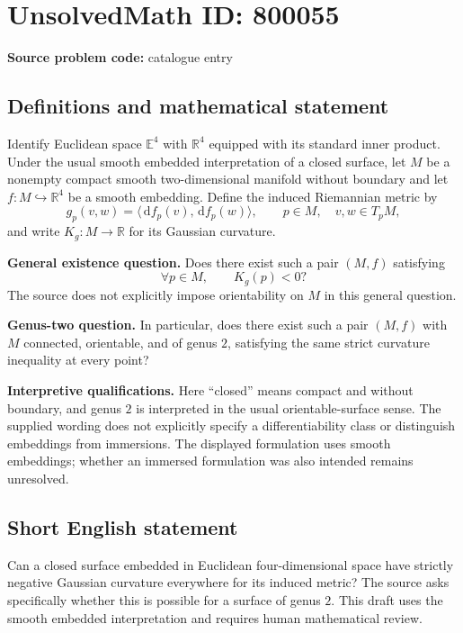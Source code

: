 \documentclass[11pt]{article}
\newcommand{\R}{\mathbb{R}}
\newcommand{\dd}{\,\mathrm{d}}
\begin{document}
\section*{UnsolvedMath ID: 800055}
\textbf{Source problem code:} catalogue entry
\subsection{Definitions and mathematical statement}
Identify Euclidean space $\mathbb{E}^4$ with $\R^4$ equipped with its standard inner product. Under the usual smooth embedded interpretation of a closed surface, let $M$ be a nonempty compact smooth two-dimensional manifold without boundary and let $f\colon M\hookrightarrow\R^4$ be a smooth embedding. Define the induced Riemannian metric by
\[
 g_p(v,w)=\langle \dd f_p(v),\dd f_p(w)\rangle,
 \qquad p\in M,\quad v,w\in T_pM,
\]
and write $K_g\colon M\to\R$ for its Gaussian curvature.

\textbf{General existence question.} Does there exist such a pair $(M,f)$ satisfying
\[
 \forall p\in M,\qquad K_g(p)<0?
\]
The source does not explicitly impose orientability on $M$ in this general question.

\textbf{Genus-two question.} In particular, does there exist such a pair $(M,f)$ with $M$ connected, orientable, and of genus $2$, satisfying the same strict curvature inequality at every point?

\textbf{Interpretive qualifications.} Here ``closed'' means compact and without boundary, and genus $2$ is interpreted in the usual orientable-surface sense. The supplied wording does not explicitly specify a differentiability class or distinguish embeddings from immersions. The displayed formulation uses smooth embeddings; whether an immersed formulation was also intended remains unresolved.
\subsection{Short English statement}
Can a closed surface embedded in Euclidean four-dimensional space have strictly negative Gaussian curvature everywhere for its induced metric? The source asks specifically whether this is possible for a surface of genus $2$. This draft uses the smooth embedded interpretation and requires human mathematical review.
\end{document}
